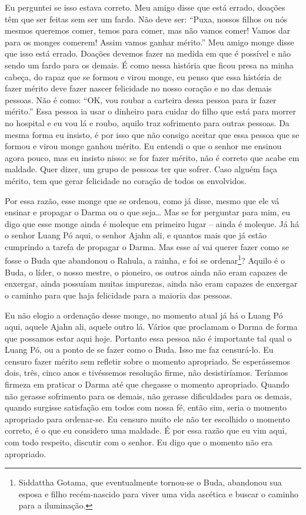 Eu perguntei se isso estava correto. Meu amigo disse que está
errado, doações têm que ser feitas sem ser um fardo. Não deve ser:
“Puxa, nossos filhos ou nós mesmos queremos comer, temos para comer,
mas não vamos comer! Vamos dar para os monges comerem! Assim vamos
ganhar mérito.” Meu amigo monge disse que isso está errado. Doações
devemos fazer na medida em que é possível e não sendo um fardo para os
demais. É como nessa história que ficou presa na minha cabeça, do rapaz
que se formou e virou monge, eu penso que essa história de fazer mérito
deve fazer nascer felicidade no nosso coração e no das demais pessoas.
Não é como: “OK, vou roubar a carteira dessa pessoa para ir fazer
mérito.” Essa pessoa ia usar o dinheiro para cuidar do filho que está
para morrer no hospital e eu vou lá e roubo, aquilo traz sofrimento
para outras pessoas. Da mesma forma eu insisto, é por isso que não
consigo aceitar que essa pessoa que se formou e virou monge ganhou
mérito. Eu entendi o que o senhor me ensinou agora pouco, mas eu
insisto nisso: se for fazer mérito, não é correto que acabe em maldade.
Quer dizer, um grupo de pessoas ter que sofrer. Caso alguém faça
mérito, tem que gerar felicidade no coração de todos os envolvidos. 

Por essa razão, esse monge que se ordenou, como já disse, mesmo que
ele vá ensinar e propagar o Darma ou o que seja… Mas se for perguntar
para mim, eu digo que esse monge ainda é moleque em primeiro lugar –
ainda é moleque. Já há o senhor Luang Pó aqui, o senhor Ajahn ali, e
quantos mais que já estão cumprindo a tarefa de propagar o Darma. Mas
esse aí vai querer fazer como se fosse o Buda que abandonou o Rahula, a
rainha, e foi se ordenar\footnote{Siddattha Gotama, que eventualmente
tornou-se o Buda, abandonou sua esposa e filho recém-nascido para viver
uma vida ascética e buscar o caminho para a iluminação.}? Aquilo é o
Buda, o líder, o nosso mestre, o pioneiro, os outros ainda não eram
capazes de enxergar, ainda possuíam muitas impurezas, ainda não eram
capazes de enxergar o caminho para que haja felicidade para a maioria
das pessoas. 

Eu não elogio a ordenação desse monge, no momento atual já há o
Luang Pó aqui, aquele Ajahn ali, aquele outro lá. Vários que proclamam
o Darma de forma que possamos estar aqui hoje. Portanto essa pessoa não
é importante tal qual o Luang Pó, ou a ponto de se fazer como o Buda.
Isso me faz censurá-lo. Eu censuro fazer mérito sem refletir sobre o
momento apropriado. Se esperássemos dois, três, cinco anos e tivéssemos
resolução firme, não desistiríamos. Teríamos firmeza em praticar o
Darma até que chegasse o momento apropriado. Quando não gerasse
sofrimento para os demais, não gerasse dificuldades para os demais,
quando surgisse satisfação em todos com nossa fé, então sim, seria o
momento apropriado para ordenar-se. Eu censuro muito ele não ter
escolhido o momento correto, é o que eu considero uma maldade. É por
essa razão que eu vim aqui, com todo respeito, discutir com o senhor.
Eu digo que o momento não era apropriado.


